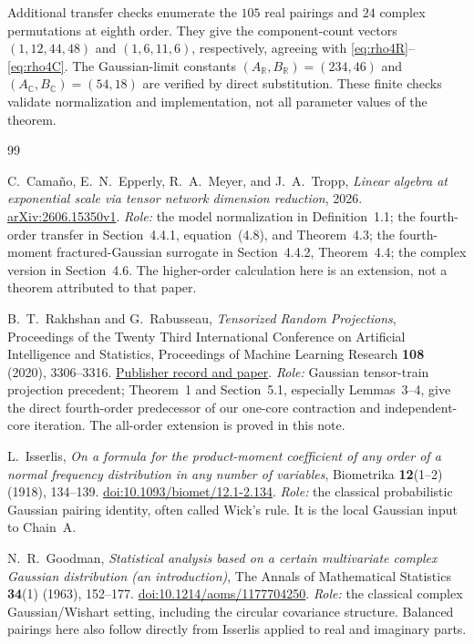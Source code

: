 \documentclass[11pt]{article}
\numberwithin{equation}{section}
\theoremstyle{definition}\newtheorem{definition}[theorem]{Definition}
\theoremstyle{remark}\newtheorem{remark}[theorem]{Remark}
\newcommand{\R}{\mathbb R}\newcommand{\E}{\mathbb E}\newcommand{\Prob}{\mathbb P}
\newcommand{\C}{\mathbb C}
\begin{document}
Additional transfer checks enumerate the $105$ real pairings and $24$ complex
permutations at eighth order. They give the component-count vectors
$(1,12,44,48)$ and $(1,6,11,6)$, respectively, agreeing with
\eqref{eq:rho4R}--\eqref{eq:rho4C}. The Gaussian-limit constants
$(A_{\R},B_{\R})=(234,46)$ and $(A_{\C},B_{\C})=(54,18)$ are verified by direct
substitution. These finite checks validate normalization and implementation,
not all parameter values of the theorem.

\clearpage
\begin{thebibliography}{99}
\raggedright
{}
\setlength{\itemsep}{8pt}

C.~Cama\~no, E.~N.~Epperly, R.~A.~Meyer, and J.~A.~Tropp,
\emph{Linear algebra at exponential scale via tensor network dimension reduction},
2026. \href{https://arxiv.org/abs/2606.15350v1}{arXiv:2606.15350v1}.
\textit{Role:} the model normalization in Definition~1.1; the fourth-order
transfer in Section~4.4.1, equation~(4.8), and Theorem~4.3; the fourth-moment
fractured-Gaussian surrogate in Section~4.4.2, Theorem~4.4; the complex version
in Section~4.6. The higher-order calculation here is an extension, not a theorem
attributed to that paper.

B.~T.~Rakhshan and G.~Rabusseau,
\emph{Tensorized Random Projections},
Proceedings of the Twenty Third International Conference on Artificial
Intelligence and Statistics, Proceedings of Machine Learning Research
\textbf{108} (2020), 3306--3316.
\href{https://proceedings.mlr.press/v108/rakhshan20a.html}{Publisher record and paper}.
\textit{Role:} Gaussian tensor-train projection precedent; Theorem~1 and
Section~5.1, especially Lemmas~3--4, give the direct fourth-order predecessor of
our one-core contraction and independent-core iteration. The all-order
extension is proved in this note.

L.~Isserlis,
\emph{On a formula for the product-moment coefficient of any order of a normal
frequency distribution in any number of variables},
Biometrika \textbf{12}(1--2) (1918), 134--139.
\href{https://doi.org/10.1093/biomet/12.1-2.134}{doi:10.1093/biomet/12.1-2.134}.
\textit{Role:} the classical probabilistic Gaussian pairing identity, often
called Wick's rule. It is the local Gaussian input to Chain~A.

N.~R.~Goodman,
\emph{Statistical analysis based on a certain multivariate complex Gaussian
distribution (an introduction)},
The Annals of Mathematical Statistics \textbf{34}(1) (1963), 152--177.
\href{https://doi.org/10.1214/aoms/1177704250}{doi:10.1214/aoms/1177704250}.
\textit{Role:} the classical complex Gaussian/Wishart setting, including the
circular covariance structure. Balanced pairings here also follow directly
from Isserlis applied to real and imaginary parts.


\end{thebibliography}
\end{document}
